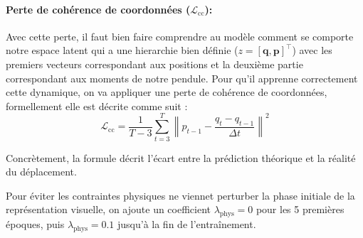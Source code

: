 \documentclass[11pt]{article}
\begin{document}
 \paragraph{Perte de cohérence de coordonnées ($\mathcal{L}_{\text{cc}}$):}
 Avec cette perte, il faut bien faire comprendre au modèle comment se comporte notre espace latent qui a une hierarchie bien définie ($z = [\mathbf{q}, \mathbf{p}]^{\top}$) avec les premiers vecteurs correspondant aux positions et la deuxième partie correspondant aux moments de notre pendule. Pour qu'il apprenne correctement cette dynamique, on va appliquer une perte de cohérence de coordonnées, formellement elle est décrite comme suit :
     \begin{equation}
        \mathcal{L}_{\text{cc}} = \frac{1}{T-3} \sum_{t=3}^T \left\| p_{t-1} - \frac{q_t - q_{t-1}}{\Delta t} \right\|^2
    \end{equation}

Concrètement, la formule décrit l'écart entre la prédiction théorique et la réalité du déplacement.


Pour éviter les contraintes physiques ne viennet perturber la phase initiale de la représentation visuelle, on ajoute un coefficient $\lambda_{\text{phys}} = 0$ pour les 5 premières époques, puis $\lambda_{\text{phys}} = 0.1$ jusqu'à la fin de l'entraînement.

%
%
\end{document}
